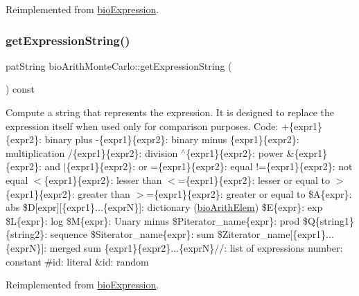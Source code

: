Reimplemented from \hyperlink{classbio_expression_a5915579d1193f25f216c1e273c97f2ce}{bio\+Expression}.

\mbox{\label{classbio_arith_monte_carlo_ab8753ef1b6b13b97c7991fe238869dbf}} 
\subsubsection{\texorpdfstring{get\+Expression\+String()}{getExpressionString()}}
{\footnotesize\ttfamily pat\+String bio\+Arith\+Monte\+Carlo\+::get\+Expression\+String (\begin{DoxyParamCaption}{ }\end{DoxyParamCaption}) const\hspace{0.3cm}{\ttfamily [virtual]}}

Compute a string that represents the expression. It is designed to replace the expression itself when used only for comparison purposes. Code\+: +\{expr1\}\{expr2\}\+: binary plus -\/\{expr1\}\{expr2\}\+: binary minus \{expr1\}\{expr2\}\+: multiplication /\{expr1\}\{expr2\}\+: division $^\wedge$\{expr1\}\{expr2\}\+: power \&\{expr1\}\{expr2\}\+: and $\vert$\{expr1\}\{expr2\}\+: or =\{expr1\}\{expr2\}\+: equal !=\{expr1\}\{expr2\}\+: not equal $<$\{expr1\}\{expr2\}\+: lesser than $<$=\{expr1\}\{expr2\}\+: lesser or equal to $>$\{expr1\}\{expr2\}\+: greater than $>$=\{expr1\}\{expr2\}\+: greater or equal to \$A\{expr\}\+: abs \$D\mbox{[}expr\mbox{]}\mbox{[}\{expr1\}...\{exprN\}\mbox{]}\+: dictionary (\hyperlink{classbio_arith_elem}{bio\+Arith\+Elem}) \$E\{expr\}\+: exp \$L\{expr\}\+: log \$M\{expr\}\+: Unary minus \$\+Piterator\+\_\+name\{expr\}\+: prod \$Q\{string1\}\{string2\}\+: sequence \$\+Siterator\+\_\+name\{expr\}\+: sum \$\+Ziterator\+\_\+name\mbox{[}\{expr1\}...\{exprN\}\mbox{]}\+: merged sum \{expr1\}\{expr2\}...\{exprN\}//\+: list of expressions number\+: constant \#id\+: literal \&id\+: random 

Reimplemented from \hyperlink{classbio_expression_a3e4b4dca58dbbc6f0e411b30eb3f60b4}{bio\+Expression}.

\mbox{\label{classbio_arith_monte_carlo_a6d0d957fe1a3eb664f07bda138d2624a}} 
